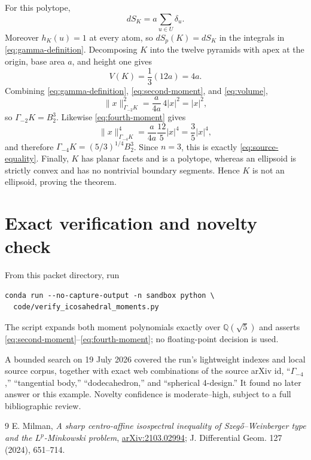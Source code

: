 \documentclass[11pt]{article}
\newcommand{\Gm}[1]{\Gamma_{-#1}}
\begin{document}
For this polytope,
\[
 dS_K=a\sum_{u\in U}\delta_u.
\]
Moreover $h_K(u)=1$ at every atom, so $dS_p(K)=dS_K$ in the integrals in
\eqref{eq:gamma-definition}. Decomposing $K$ into the twelve pyramids with
apex at the origin, base area $a$, and height one gives
\begin{equation}\label{eq:volume}
 V(K)=\frac13(12a)=4a.
\end{equation}
Combining \eqref{eq:gamma-definition}, \eqref{eq:second-moment}, and
\eqref{eq:volume},
\[
 \|x\|_{\Gm2K}^2=\frac{a}{4a}\,4|x|^2=|x|^2,
\]
so $\Gm2K=B_2^3$. Likewise \eqref{eq:fourth-moment} gives
\[
 \|x\|_{\Gm4K}^4
 =\frac{a}{4a}\frac{12}{5}|x|^4=\frac35|x|^4,
\]
and therefore $\Gm4K=(5/3)^{1/4}B_2^3$. Since $n=3$, this is exactly
\eqref{eq:source-equality}. Finally, $K$ has planar facets and is a polytope,
whereas an ellipsoid is strictly convex and has no nontrivial boundary
segments. Hence $K$ is not an ellipsoid, proving the theorem.

\section{Exact verification and novelty check}

From this packet directory, run
\begin{verbatim}
conda run --no-capture-output -n sandbox python \
  code/verify_icosahedral_moments.py
\end{verbatim}
The script expands both moment polynomials exactly over $\mathbb Q(\sqrt5)$
and asserts \eqref{eq:second-moment}--\eqref{eq:fourth-moment}; no
floating-point decision is used.

A bounded search on 19 July 2026 covered the run's lightweight indexes and
local source corpus, together with exact web combinations of the source arXiv
id, ``$\Gamma_{-4}$,'' ``tangential body,'' ``dodecahedron,'' and ``spherical
4-design.'' It found no later answer or this example. Novelty confidence is
moderate--high, subject to a full bibliographic review.

\begin{thebibliography}{9}
E. Milman,
\emph{A sharp centro-affine isospectral inequality of
Szeg\H{o}--Weinberger type and the $L^p$-Minkowski problem},
\href{https://arxiv.org/abs/2103.02994}{arXiv:2103.02994};
J. Differential Geom. 127 (2024), 651--714.
\end{thebibliography}
\end{document}
